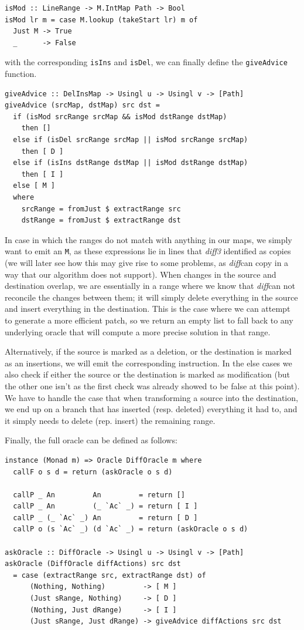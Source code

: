\documentclass[11pt, titlepage]{article}
\newcommand{\toHaskell}[1]{\texttt{#1}\xspace}
\newcommand{\diffthree}{\emph{diff3}\xspace}
\newcommand{\diff}{\emph{diff}}
\begin{document}
\begin{verbatim}
isMod :: LineRange -> M.IntMap Path -> Bool
isMod lr m = case M.lookup (takeStart lr) m of
  Just M -> True
  _      -> False
\end{verbatim}

with the corresponding \toHaskell{isIns} and \toHaskell{isDel}, we can finally define the \toHaskell{giveAdvice} function.

\begin{verbatim}
giveAdvice :: DelInsMap -> Usingl u -> Usingl v -> [Path]
giveAdvice (srcMap, dstMap) src dst =
  if (isMod srcRange srcMap && isMod dstRange dstMap)
    then []
  else if (isDel srcRange srcMap || isMod srcRange srcMap)
    then [ D ]
  else if (isIns dstRange dstMap || isMod dstRange dstMap)
    then [ I ]
  else [ M ]
  where
    srcRange = fromJust $ extractRange src
    dstRange = fromJust $ extractRange dst
\end{verbatim}

In case in which the ranges do not match with anything in our maps, we simply want to emit an \toHaskell{M}, as these expressions lie in lines that \diffthree identified as copies (we will later see how this may give rise to some problems, as \diff can copy in a way that our algorithm does not support). 
When changes in the source and destination overlap, we are essentially in a range where we know that \diff can not reconcile the changes between them; it will simply delete everything in the source and insert everything in the destination. 
This is the case where we can attempt to generate a more efficient patch, so we return an empty list to fall back to any underlying oracle that will compute a more precise solution in that range. 

Alternatively, if the source is marked as a deletion, or the destination is marked as an insertions, we will emit the corresponding instruction.
In the else cases we also check if either the source or the destination is marked as modification (but the other one isn't as the first check was already showed to be false at this point). We have to handle the case that when transforming a source into the destination, we end up on a branch that has inserted (resp. deleted) everything it had to, and it simply needs to delete (rep. insert) the remaining range.

Finally, the full oracle can be defined as follows:

\begin{verbatim}
instance (Monad m) => Oracle DiffOracle m where
  callF o s d = return (askOracle o s d)

  callP _ An         An         = return []
  callP _ An         (_ `Ac` _) = return [ I ]
  callP _ (_ `Ac` _) An         = return [ D ]
  callP o (s `Ac` _) (d `Ac` _) = return (askOracle o s d)

askOracle :: DiffOracle -> Usingl u -> Usingl v -> [Path]
askOracle (DiffOracle diffActions) src dst 
  = case (extractRange src, extractRange dst) of
      (Nothing, Nothing)         -> [ M ]
      (Just sRange, Nothing)     -> [ D ]
      (Nothing, Just dRange)     -> [ I ]
      (Just sRange, Just dRange) -> giveAdvice diffActions src dst
\end{verbatim}
\end{document}
